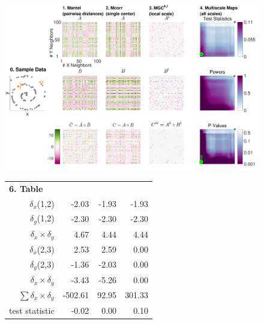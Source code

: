 \documentclass[11pt]{extarticle}
\begin{document}
\begin{figure}[htbp]
\vspace{-50pt}
\includegraphics[width=1.0\textwidth,trim={0 0 0.75cm 0},clip]{Figures/FigA}
\setlength{\tabcolsep}{10pt} %
\begin{tabular}{r r r r}
\multicolumn{1}{l}{{\small \textbf{6. Table}}} & & & \\
$\delta_x$(1,2)   & \hspace{1.5em} \color{magenta}-2.03  & \hspace{3.5em} \color{magenta}-1.93  &  \hspace{3.0em} \color{magenta}-1.93  \\
 $\delta_y$(1,2) & \color{magenta}-2.30 & \color{magenta}-2.30 & \color{magenta}-2.30  \\
 $\delta_x \times \delta_y$ & \color{green}4.67 & \color{green}4.44 & \color{green}4.44  \\

\hline

 $\delta_x$(2,3) & \color{green}2.53 & \color{green}2.59 & 0.00  \\
 $\delta_y$(2,3) &  \color{magenta}-1.36 & \color{magenta}-2.03 & 0.00  \\
 $\delta_x \times \delta_y$ & \color{magenta}-3.43 & \color{magenta}-5.26 & 0.00  \\

\hline
 $\sum{\delta_x \times \delta_y}$ & \color{magenta}-502.61   & \color{green}92.95 & \color{green}301.33  \\
 test statistic &  \color{magenta}-0.02  & 0.00 & \color{green}0.10  \\
\end{tabular}


\end{figure}
\end{document}
